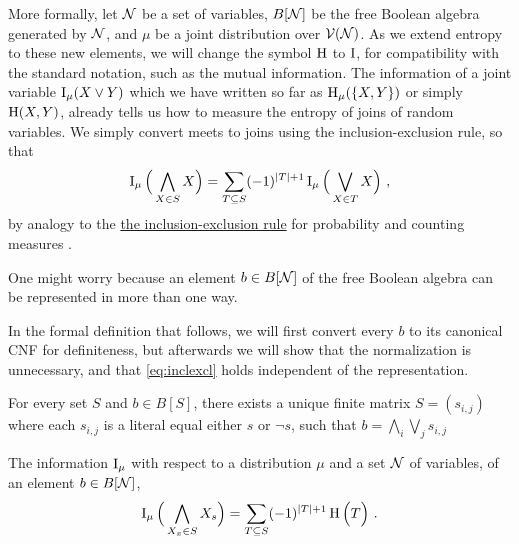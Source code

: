 \documentclass{article}
\begin{document}
    More formally, let $\mathcal N$ be a set of variables, $B[\mathcal N]$ be the free Boolean algebra generated by $\mathcal N$, and $\mu$ be a joint distribution over $\mathcal V(\mathcal N)$. As we extend entropy to these new elements, we will change the symbol $\operatorname{\mathrm{H}}$ to $\operatorname{\mathrm{I}}$, for compatibility with the standard notation, such as the mutual information. The information of a joint variable $\operatorname{\mathrm{I}}_\mu(X \lor Y)$ which we have written so far as $\operatorname{\mathrm{H}}_\mu(\{X,Y\})$ or simply $\operatorname{\mathrm{H}}(X,Y)$, already tells us how to measure the entropy of joins of random variables. We simply convert meets to joins using the inclusion-exclusion rule, so that
    \begin{equation}\label{eq:inclexcl}
        \operatorname{\mathrm{I}}_\mu\Big(\bigwedge_{X \in S} X\Big) =  \sum_{T \subseteq S} (-1)^{|T|+1} \operatorname{\mathrm{I}}_\mu\Big( \bigvee_{X \in T} X \Big) ~,
    \end{equation}
    by analogy to the
    \href{https://en.wikipedia.org/wiki/Inclusion%E2%80%93exclusion_principle}
        {the inclusion-exclusion rule} for probability and counting measures \cite[eq 2.7]{halpern2017reasoning}.

    One might worry because an element $b \in B[\mathcal N]$ of the free Boolean algebra can be represented in more than one way.

    \begin{inactive}
        In the formal definition that follows, we will first convert every $b$ to its canonical CNF for definiteness, but  afterwards we will show that the normalization is unnecessary, and that \eqref{eq:inclexcl} holds independent of the representation.

        \begin{fact}
            For every set $S$ and $b \in B[S]$, there exists a unique finite matrix $S = (s_{i,j})$ where each $s_{i,j}$ is a literal equal either $s$ or $\lnot s$, such that
            $\displaystyle b = \bigwedge_{i} \bigvee_{j} s_{i,j} $
        \end{fact}
        \begin{defn}
            The information $\operatorname{\mathrm{I}}_\mu$ with respect to a distribution $\mu$ and a set $\mathcal N$ of variables, of an element $b \in B[\mathcal N]$,
            \[          \operatorname{\mathrm{I}}_\mu\Big(\bigwedge_{X_x \in S} X_s\Big) =  \sum_{T \subseteq S} (-1)^{|T|+1} \operatorname{\mathrm{H}}\Big( T \Big) ~. \]
        \end{defn}
    \end{inactive}
\end{document}

